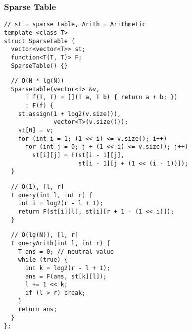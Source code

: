 \documentclass[twoside]{article}
\newcommand{\fileTitleStyle}{\large\underline}
\begin{document}
\begin{multicols*}{2}
\subsubsection*{Sparse Table}
\begin{verbatim}
// st = sparse table, Arith = Arithmetic
template <class T>
struct SparseTable {
  vector<vector<T>> st;
  function<T(T, T)> F;
  SparseTable() {}
\end{verbatim}
\vspace{-12pt}
\begin{verbatim}
  // O(N * lg(N))
  SparseTable(vector<T> &v,
      T f(T, T) = [](T a, T b) { return a + b; })
      : F(f) {
    st.assign(1 + log2(v.size()),
              vector<T>(v.size()));
    st[0] = v;
    for (int i = 1; (1 << i) <= v.size(); i++)
      for (int j = 0; j + (1 << i) <= v.size(); j++)
        st[i][j] = F(st[i - 1][j],
                     st[i - 1][j + (1 << (i - 1))]);
  }
\end{verbatim}
\vspace{-12pt}
\begin{verbatim}
  // O(1), [l, r]
  T query(int l, int r) {
    int i = log2(r - l + 1);
    return F(st[i][l], st[i][r + 1 - (1 << i)]);
  }
\end{verbatim}
\vspace{-12pt}
\begin{verbatim}
  // O(lg(N)), [l, r]
  T queryArith(int l, int r) {
    T ans = 0; // neutral value
    while (true) {
      int k = log2(r - l + 1);
      ans = F(ans, st[k][l]);
      l += 1 << k;
      if (l > r) break;
    }
    return ans;
  }
};
\end{verbatim}

\subsubsectionfont{\centering\bfseries\Large}
\subsubsectionfont{\fileTitleStyle}

\end{multicols*}
\end{document}
